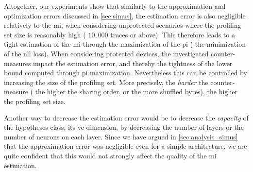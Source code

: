 Altogether, our experiments show that similarly to the approximation and optimization errors discussed in \autoref{sec:simus}, the estimation error is also negligible relatively to the \gls{mi}, when considering unprotected scenarios where the profiling set size is reasonably high (\ie{} \(10,000\) traces or above). 
This therefore leads to a tight estimation of the \gls{mi} through the maximization of the \gls{pi} (\ie{} the minimization of the \gls{nll} loss).
When considering protected devices, the investigated counter-measures impact the estimation error, and thereby the tightness of the lower bound computed through \gls{pi} maximization.
Nevertheless this can be controlled by increasing the size of the profiling set.
More precisely, the \textit{harder} the counter-measure (\ie{} the higher the sharing order, or the more shuffled bytes), the higher the profiling set size.
  
  
Another way to decrease the estimation error would be to decrease the \textit{capacity} of the hypotheses class, \ie{} its \gls{vc}-dimension, by decreasing the number of layers or the number of neurons on each layer. 
Since we have argued in \autoref{sec:analysis_simus} that the approximation error was negligible even for a simple architecture, we are quite confident that this would not strongly affect the quality of the \gls{mi} estimation.